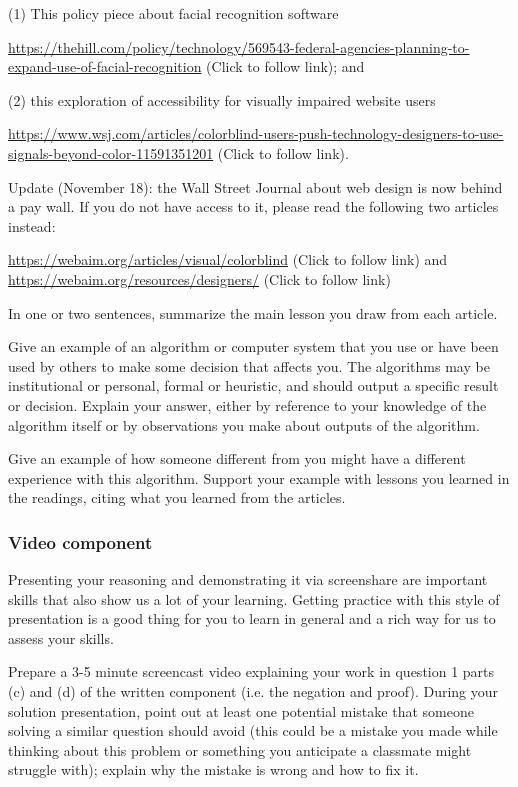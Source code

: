 \documentclass[12pt, oneside]{article}
\begin{document}
\begin{enumerate}
    (1) This policy piece about facial recognition software

    {\tiny \url{https://thehill.com/policy/technology/569543-federal-agencies-planning-to-expand-use-of-facial-recognition}}
    (Click to follow link); and 

    (2) this exploration of accessibility for visually impaired website users
    
    {\tiny \url{https://www.wsj.com/articles/colorblind-users-push-technology-designers-to-use-signals-beyond-color-11591351201}}
    (Click to follow link).

    Update (November 18): the Wall Street Journal about web design is now behind a pay wall. If you 
    do not have access to it, please read the following two articles instead:

    {\tiny \url{https://webaim.org/articles/visual/colorblind}}
    (Click to follow link) and
    {\tiny \url{https://webaim.org/resources/designers/}}
    (Click to follow link)


    In one or two sentences, summarize the main lesson you draw from each article.

    Give an example of an algorithm or computer system that you use or have been used by others to 
    make some decision that affects you. The algorithms may be institutional or personal, formal or 
    heuristic, and should output a 
    specific result or decision. Explain your answer, either by reference to your knowledge of 
    the algorithm itself or by observations you make 
    about outputs of the algorithm.

    Give an example of how someone different from you might have a different experience 
    with this algorithm. Support your example with lessons you learned in the 
    readings, citing what you learned from the articles.
\end{enumerate}

\subsubsection*{Video component}
Presenting your reasoning and demonstrating it via screenshare are important skills that 
also show us a lot of your learning. Getting practice with this style of presentation 
is a good thing for you to learn in general and a rich way for us to assess your skills. 

Prepare a 3-5 minute screencast video explaining your work in question 1 parts (c) and (d)
of the written component (i.e. the negation and proof).
During your solution presentation, point out at least one potential mistake that someone 
solving a similar question should avoid (this could be a mistake you made while thinking 
about this problem or something you anticipate a classmate might struggle with); 
explain why the mistake is wrong and how to fix it. 
\end{document}
